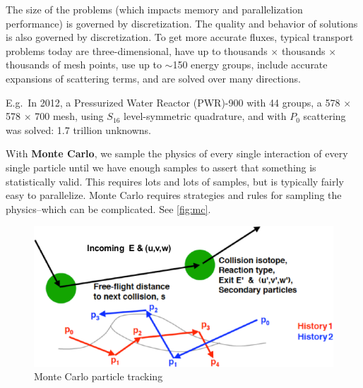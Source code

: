 \documentclass[12pt]{article}
\begin{document}
The size of the problems (which impacts memory and parallelization performance) is governed by discretization. The quality and behavior of solutions is also governed by discretization. To get more accurate fluxes, typical transport problems today are three-dimensional, have up to thousands $\times$ thousands $\times$ thousands of mesh points, use up to $\sim$150 energy groups, include accurate expansions of scattering terms, and are solved over many directions. 
%

E.g.\ In 2012, a Pressurized Water Reactor (PWR)-900 with 44 groups, a 578 $\times$ 578 $\times$ 700 mesh, using $S_{16}$ level-symmetric quadrature, and with $P_{0}$ scattering was solved: 1.7 trillion unknowns.

With \textbf{Monte Carlo}, we sample the physics of every single interaction of every single particle until we have enough samples to assert that something is statistically valid. This requires lots and lots of samples, but is typically fairly easy to parallelize. Monte Carlo requires strategies and rules for sampling the physics--which can be complicated. See \autoref{fig:mc}.
\begin{figure}[h!]
    \begin{center}
    \includegraphics[keepaspectratio, width = 4 in]{../figs/MC}
    \end{center}
    \caption{Monte Carlo particle tracking}
    \label{fig:mc}
\end{figure}
\end{document}
